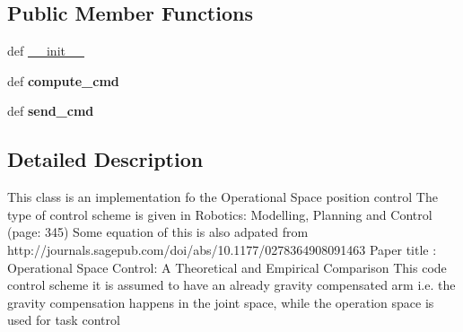 \subsection*{Public Member Functions}
\begin{DoxyCompactItemize}
\item 
def \hyperlink{classaml__ctrl_1_1controllers_1_1os__controllers_1_1os__postn__controller_1_1_o_s_position_controller_a4ef9b21568a648b97bcd2fbf1781055a}{\-\_\-\-\_\-init\-\_\-\-\_\-}
\item 
\hypertarget{classaml__ctrl_1_1controllers_1_1os__controllers_1_1os__postn__controller_1_1_o_s_position_controller_a2dfdbc0052a9e76beebe4f265cb6b47d}{def {\bfseries compute\-\_\-cmd}}\label{classaml__ctrl_1_1controllers_1_1os__controllers_1_1os__postn__controller_1_1_o_s_position_controller_a2dfdbc0052a9e76beebe4f265cb6b47d}

\item 
\hypertarget{classaml__ctrl_1_1controllers_1_1os__controllers_1_1os__postn__controller_1_1_o_s_position_controller_a5ab45b868042fa13b9a38e785e8b5d6b}{def {\bfseries send\-\_\-cmd}}\label{classaml__ctrl_1_1controllers_1_1os__controllers_1_1os__postn__controller_1_1_o_s_position_controller_a5ab45b868042fa13b9a38e785e8b5d6b}

\end{DoxyCompactItemize}


\subsection{Detailed Description}
\begin{DoxyVerb}This class is an implementation fo the Operational Space position control
The type of control scheme is given in Robotics: Modelling, Planning and Control (page: 345)
Some equation of this is also adpated from http://journals.sagepub.com/doi/abs/10.1177/0278364908091463
Paper title : Operational Space Control: A Theoretical and Empirical Comparison
This code control scheme it is assumed to have an already gravity compensated arm
i.e. the gravity compensation happens in the joint space, while the operation space is used for task control
\end{DoxyVerb}
 


